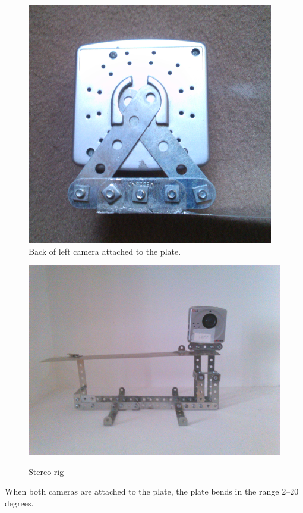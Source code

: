 \documentclass[11pt]{report}
\begin{document}
\begin{figure}[H]
  \centering
  \includegraphics[scale=0.3]{images/attachleft.png}

  \label{fig:attach-left}
  \caption{Back of left camera attached to the plate.}
\end{figure}

\begin{figure}[H]
  \centering
  \includegraphics[scale=0.3]{images/rig1.png}
  \label{fig:rig}
  \caption{Stereo rig}
\end{figure}

When both cameras are attached to the plate, the plate bends in the range 2--20 degrees.
\end{document}
